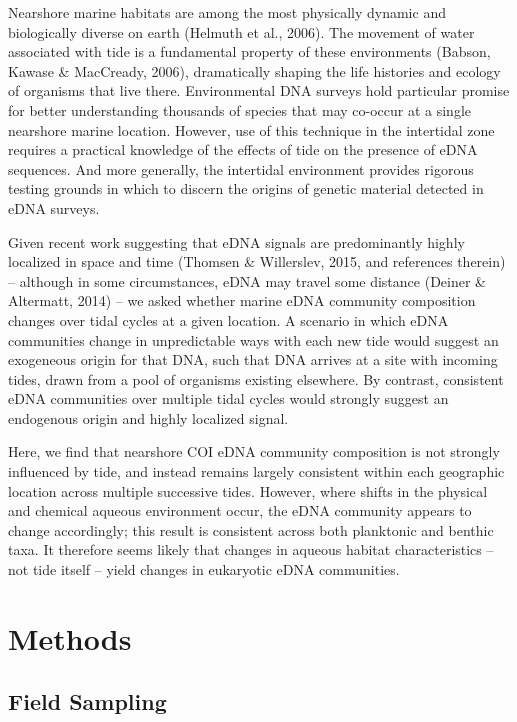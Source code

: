 \documentclass[fleqn,10pt,lineno]{wlpeerj} %
\begin{document}
Nearshore marine habitats are among the most physically dynamic and
biologically diverse on earth (Helmuth et al., 2006). The movement of
water associated with tide is a fundamental property of these
environments (Babson, Kawase \& MacCready, 2006), dramatically shaping
the life histories and ecology of organisms that live there.
Environmental DNA surveys hold particular promise for better
understanding thousands of species that may co-occur at a single
nearshore marine location. However, use of this technique in the
intertidal zone requires a practical knowledge of the effects of tide on
the presence of eDNA sequences. And more generally, the intertidal environment
provides rigorous testing grounds in which to discern the origins of
genetic material detected in eDNA surveys.

Given recent work suggesting that eDNA signals are predominantly highly
localized in space and time (Thomsen \& Willerslev, 2015, and references
therein) -- although in some circumstances, eDNA may travel some
distance (Deiner \& Altermatt, 2014) -- we asked whether marine eDNA
community composition changes over tidal cycles at a given location. A
scenario in which eDNA communities change in unpredictable ways with
each new tide would suggest an exogeneous origin for that DNA, such that
DNA arrives at a site with incoming tides, drawn from a pool of
organisms existing elsewhere. By contrast, consistent eDNA communities
over multiple tidal cycles would strongly suggest an endogenous origin
and highly localized signal.

Here, we find that nearshore COI eDNA community composition is not
strongly influenced by tide, and instead remains largely consistent
within each geographic location across multiple successive tides.
However, where shifts in the physical and chemical aqueous environment
occur, the eDNA community appears to change accordingly; this result is consistent across both planktonic and benthic taxa. It therefore
seems likely that changes in aqueous habitat characteristics -- not tide
itself -- yield changes in eukaryotic eDNA communities.

\section{Methods}\label{methods}

\subsection{Field Sampling}\label{field-sampling}
\end{document}
